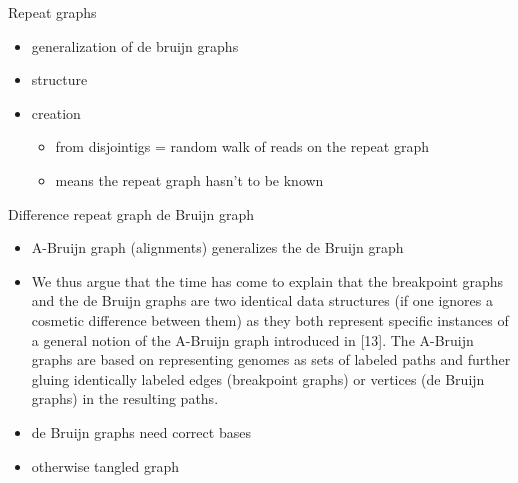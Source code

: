 \documentclass{beamer}
\begin{document}
  \begin{frame}{Repeat graphs}
    \begin{itemize}
      \item generalization of de bruijn graphs

      \item structure

      \item creation
      
      \begin{itemize}

        \item from disjointigs = random walk of reads on the repeat graph 
      
        \item means the repeat graph hasn't to be known
      \end{itemize}
    \end{itemize}
  \end{frame}

  \begin{frame}{Difference repeat graph de Bruijn graph}
    \begin{itemize}
      \item A-Bruijn graph (alignments) generalizes the de Bruijn graph

      \item We thus argue that the time has come to explain that the breakpoint graphs and the de Bruijn graphs are two identical data structures (if one ignores a cosmetic difference between them) as they both represent specific instances of a general notion of the A-Bruijn graph introduced in [13]. The A-Bruijn graphs are based on representing genomes as sets of labeled paths and further gluing identically labeled edges (breakpoint graphs) or vertices (de Bruijn graphs) in the resulting paths.

      \item de Bruijn graphs need correct bases
      
      \item otherwise tangled graph
    \end{itemize}
  \end{frame}
\end{document}

